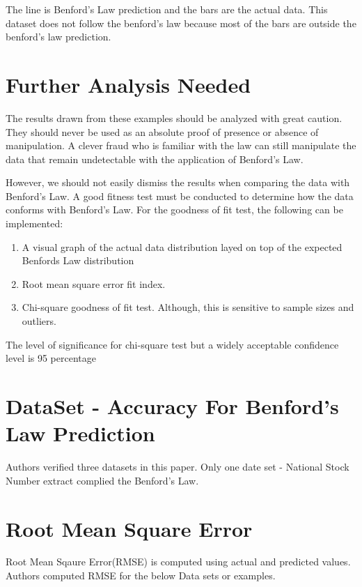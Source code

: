 The line is Benford’s Law prediction and the bars are 
the actual data. This dataset does not follow the benford's law
because most of the bars are outside the benford's law prediction.


\section{Further Analysis Needed}
The results drawn from these examples should 
be analyzed with great caution. They should 
never be used as an absolute proof of presence 
or absence of manipulation. A clever fraud who 
is familiar with the law can still manipulate 
the data that remain undetectable with the 
application of Benford’s Law.

However, we should not easily dismiss the results 
when comparing the data with Benford’s Law. 
A good fitness test must be conducted to determine 
how the data conforms with Benford’s Law.
For the goodness of fit test, the following can be implemented:

\begin{enumerate}
\item A visual graph of the actual data distribution 
layed on top of the expected Benfords Law distribution
\item Root mean square error fit index.
\item Chi-square goodness of fit test. Although, 
this is sensitive to sample sizes and outliers.
\end{enumerate}

The level of significance for chi-square test 
but a widely acceptable confidence level is 95 percentage

\section{DataSet - Accuracy For Benford's Law Prediction}
Authors verified three datasets in this paper. Only one
date set - National Stock Number extract 
complied the Benford's Law.

\section{Root Mean Square Error}
Root Mean Sqaure Error(RMSE) is computed 
using actual and predicted values.
Authors computed RMSE for the below Data sets or examples.

